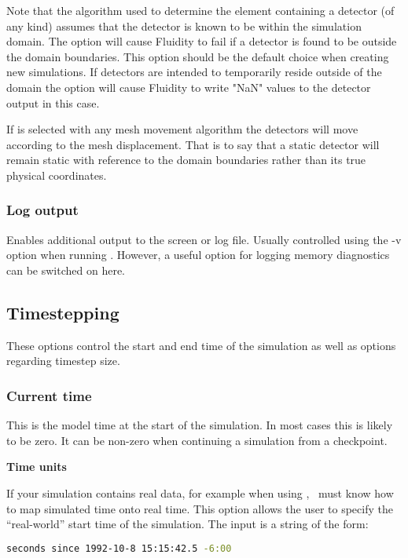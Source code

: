 Note that the algorithm used to determine the element containing a detector (of
any kind) assumes that the detector is known to be within the simulation domain.
The option  will cause Fluidity to fail if a detector
is found to be outside the domain boundaries. 
This option should be the default choice when creating new simulations.
If detectors are intended to temporarily reside outside of the domain the option
 will cause Fluidity to write "NaN" values 
to the detector output in this case.

If  is selected with any mesh movement algorithm the 
detectors will move according to the mesh displacement. 
That is to say that a static detector will remain static with reference to the 
domain boundaries rather than its true physical coordinates.

\subsubsection{Log output}

Enables additional output to the screen or log file. Usually controlled
using the -v option when running \fluidity. However, a useful option for
logging memory diagnostics can be switched on here.

\subsection{Timestepping}
These options control the start and end time of the simulation as well as options regarding timestep size.

\subsubsection{Current time}
This is the model time at the start of the simulation. In most cases this is likely to be zero. It can be non-zero when continuing a simulation from a checkpoint.

\textbf{Time units}

If your simulation contains real data, for example when using
, \fluidity\ must know how to map simulated time onto
real time. This option allows the user to specify the ``real-world'' start
time of the simulation.  The input is a string of the form:
\begin{lstlisting}[language=bash]
seconds since 1992-10-8 15:15:42.5 -6:00 
\end{lstlisting} 

